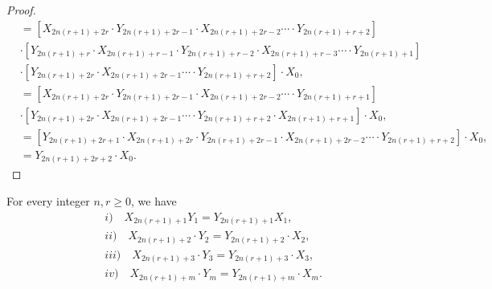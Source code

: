 \begin{proof}
\begin{align*}
&=\left[X_{2n(r+1)+2r}\cdot Y_{2n(r+1)+2r-1}\cdot X_{2n(r+1)+2r-2}\cdots\cdot Y_{2n(r+1)+r+2}\right]\\
&\cdot\left[Y_{2n(r+1)+r}\cdot X_{2n(r+1)+r-1}\cdot Y_{2n(r+1)+r-2}\cdot X_{2n(r+1)+r-3}\cdots\cdot Y_{2n(r+1)+1}\right]\\
&\cdot\left[Y_{2n(r+1)+2r}\cdot X_{2n(r+1)+2r-1}\cdots\cdot Y_{2n(r+1)+r+2}\right]\cdot X_{0},\\
&=\left[X_{2n(r+1)+2r}\cdot Y_{2n(r+1)+2r-1}\cdot X_{2n(r+1)+2r-2}\cdots\cdot Y_{2n(r+1)+r+1}\right]\\
&\cdot\left[Y_{2n(r+1)+2r}\cdot X_{2n(r+1)+2r-1}\cdots\cdot Y_{2n(r+1)+r+2}\cdot X_{2n(r+1)+r+1}\right]\cdot X_{0},\\
&=\left[Y_{2n(r+1)+2r+1}\cdot X_{2n(r+1)+2r}\cdot Y_{2n(r+1)+2r-1}\cdot X_{2n(r+1)+2r-2}\cdots\cdot Y_{2n(r+1)+r+2}\right]\cdot X_{0},\\
&=Y_{2n(r+1)+2r+2}\cdot X_{0}.
\end{align*}
\end{proof}
\begin{theorem} For every integer $n, r\geq0$, we have
\begin{align}
&i)\quad X_{2n(r+1)+1} Y_{1}=Y_{2n(r+1)+1} X_{1},\\
&ii)\quad X_{2n(r+1)+2}\cdot Y_{2}=Y_{2n(r+1)+2}\cdot X_{2},\\
&iii)\quad X_{2n(r+1)+3}\cdot Y_{3}=Y_{2n(r+1)+3}\cdot X_{3},\\
&iv)\quad X_{2n(r+1)+m}\cdot Y_{m}=Y_{2n(r+1)+m}\cdot X_{m}.
\end{align}
\end{theorem}
